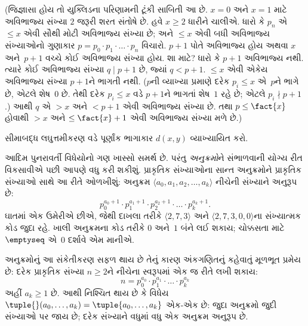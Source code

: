 (જિજ્ઞાસા હોય તો યુક્લિડના પરિણામની ટૂંકી સાબિતી આ છે. $x=0$
અને $x=1$ માટે અવિભાજ્ય સંખ્યા $2$ જરૂરી શરત સંતોષે છે. હવે
$x\geq 2$ ધારીને ચાલીએ. ધારો કે
$p_n$ એ $\le x$ એવી સૌથી મોટી અવિભાજ્ય સંખ્યા છે; અને
$\le x$ એવી બધી અવિભાજ્ય સંખ્યાઓનો ગુણાકાર $p =
p_0\cdot p_1 \cdot \dots \cdot p_n$ વિચારો. $p+1$ પોતે અવિભાજ્ય
હોય અથવા $x$ અને~$p+1$ વચ્ચે કોઈ અવિભાજ્ય સંખ્યા હોય. શા માટે?
ધારો કે $p+1$ અવિભાજ્ય નથી. ત્યારે કોઈ અવિભાજ્ય સંખ્યા
$q \mid p+1$ છે, જ્યાં $q < p+1$. $\le x$ એવી એકેય અવિભાજ્ય
સંખ્યા $p+1$ને ભાગતી નથી. ($p$ની વ્યાખ્યા પ્રમાણે દરેક
$p_i \le x$ એ~$p$ને ભાગે છે, એટલે શેષ~$0$ છે. તેથી દરેક
$p_i \le x$ વડે $p+1$ને ભાગતાં શેષ~$1$ રહે છે; એટલે
$p_i \nmid p+1$.) આથી $q$ એ $> x$ અને $< p+1$ એવી અવિભાજ્ય
સંખ્યા છે. તથા $p \le \fact{x}$ હોવાથી $> x$ અને
$\le \fact{x}+1$ એવી અવિભાજ્ય સંખ્યા મળે છે.)

\begin{prob}
સીમાબદ્ધ લઘુત્તમીકરણ વડે પૂર્ણાંક ભાગાકાર $d(x, y)$ વ્યાખ્યાયિત
કરો.
\end{prob}
\endgroup


\begingroup
\makeatletter{}\makeatother

\label{guunit:OLP-0220}


આદિમ પુનરાવર્તી વિધેયોનો ગણ ખાસ્સો સમર્થ છે. પરંતુ
\emph{અનુક્રમો}ને સંભાળવાની યોગ્ય રીત વિકસાવીએ પછી આપણે વધુ કરી
શકીશું. પ્રાકૃતિક સંખ્યાઓના સાન્ત અનુક્રમોને પ્રાકૃતિક સંખ્યાઓ સાથે
આ રીતે ઓળખીશું: અનુક્રમ $\langle a_0, a_1, a_2, \dots, a_k \rangle$
નીચેની સંખ્યાને અનુરૂપ છે:
\[
p_0^{a_0+1} \cdot p_1^{a_1+1} \cdot p_2^{a_2+1} \cdot \dots \cdot
p_k^{a_k+1}.
\]
ઘાતમાં એક ઉમેરીએ છીએ, જેથી દાખલા તરીકે
$\langle 2, 7, 3\rangle$ અને $\langle 2, 7, 3, 0, 0 \rangle$ના
સંખ્યાત્મક કોડ જુદા રહે. ખાલી અનુક્રમના કોડ તરીકે $0$ અને~$1$ બંને
લઈ શકાય; ચોક્કસતા માટે $\emptyseq$ એ~$0$ દર્શાવે એમ માનીએ.

અનુક્રમોનું આ સંકેતીકરણ સફળ થાય છે તેનું કારણ અંકગણિતનું કહેવાતું
મૂળભૂત પ્રમેય છે: દરેક પ્રાકૃતિક સંખ્યા $n \ge 2$ને નીચેના
સ્વરૂપમાં એક જ રીતે લખી શકાય:
\[
n = p_0^{a_0} \cdot p_1^{a_1} \cdot \dots \cdot p_k^{a_k}
\]
અહીં $a_k \ge 1$ છે. આથી નિશ્ચિત થાય છે કે વિધેય
$\tuple{}(a_0,
\dots, a_k) = \tuple{a_0, \dots, a_k}$ એક-એક છે: જુદા
અનુક્રમો જુદી સંખ્યાઓ પર જાય છે; દરેક સંખ્યાને વધુમાં વધુ એક
અનુક્રમ અનુરૂપ છે.

